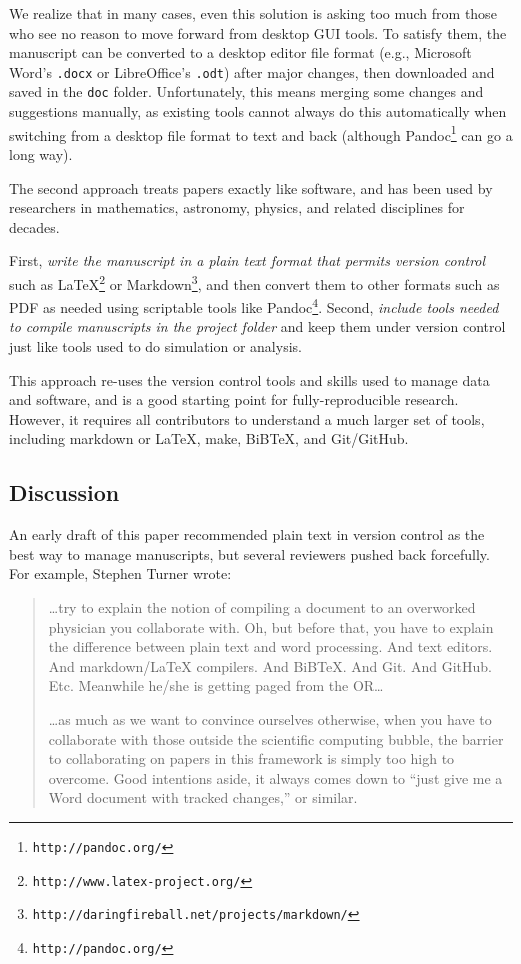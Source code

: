 \documentclass[10pt]{article}
\newcommand{\recommend}[1]{\textit{#1}}
\newcommand{\withurl}[2]{{#1}\footnote{\texttt{#2}}}
\begin{document}
We realize that in many cases, even this solution is asking too much
from those who see no reason to move forward from desktop GUI tools. To
satisfy them, the manuscript can be converted to a desktop editor file
format (e.g., Microsoft Word's \texttt{.docx} or LibreOffice's
\texttt{.odt}) after major changes, then downloaded and saved in the
\texttt{doc} folder. Unfortunately, this means merging some changes and
suggestions manually, as existing tools cannot always do this
automatically when switching from a desktop file format to text and back
(although \withurl{Pandoc}{http://pandoc.org/} can go a long way).

The second approach treats papers exactly like software, and has been
used by researchers in mathematics, astronomy, physics, and related
disciplines for decades.

First, \recommend{write the manuscript in a plain text format that
  permits version control} such as
\withurl{LaTeX}{http://www.latex-project.org/} or
\withurl{Markdown}{http://daringfireball.net/projects/markdown/}, and
then convert them to other formats such as PDF as needed using
scriptable tools like \withurl{Pandoc}{http://pandoc.org/}.  Second,
\recommend{include tools needed to compile manuscripts in the project
  folder} and keep them under version control just like tools used to
do simulation or analysis.

This approach re-uses the version control tools and skills used to
manage data and software, and is a good starting point for
fully-reproducible research. However, it requires all contributors to
understand a much larger set of tools, including markdown or LaTeX,
make, BiBTeX, and Git/GitHub.

\subsection*{Discussion}

An early draft of this paper recommended plain text in version control
as the best way to manage manuscripts, but several reviewers pushed back
forcefully. For example, Stephen Turner wrote:

\begin{quote}
{\ldots}try to explain the notion of compiling a document to an
overworked physician you collaborate with. Oh, but before that, you have
to explain the difference between plain text and word processing. And
text editors. And markdown/LaTeX compilers. And BiBTeX. And Git. And
GitHub. Etc. Meanwhile he/she is getting paged from the OR{\ldots}

{\ldots}as much as we want to convince ourselves otherwise, when you
have to collaborate with those outside the scientific computing bubble,
the barrier to collaborating on papers in this framework is simply too
high to overcome. Good intentions aside, it always comes down to ``just
give me a Word document with tracked changes,'' or similar.
\end{quote}
\end{document}
